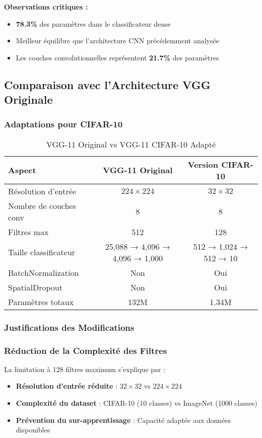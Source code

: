 \documentclass[12pt,a4paper]{article}
\begin{document}
\textbf{Observations critiques :}
\begin{itemize}
    \item \textbf{78.3\%} des paramètres dans le classificateur dense
    \item Meilleur équilibre que l'architecture CNN précédemment analysée
    \item Les couches convolutionnelles représentent \textbf{21.7\%} des paramètres
\end{itemize}

\subsection{Comparaison avec l'Architecture VGG Originale}

\subsubsection{Adaptations pour CIFAR-10}

\begin{table}[H]
\centering
\caption{VGG-11 Original vs VGG-11 CIFAR-10 Adapté}
\begin{tabular}{lcc}
\toprule
\textbf{Aspect} & \textbf{VGG-11 Original} & \textbf{Version CIFAR-10} \\
\midrule
Résolution d'entrée & $224 \times 224$ & $32 \times 32$ \\
Nombre de couches conv & 8 & 8 \\
Filtres max & 512 & 128 \\
Taille classificateur & 25,088 → 4,096 → 4,096 → 1,000 & 512 → 1,024 → 512 → 10 \\
BatchNormalization & Non & Oui \\
SpatialDropout & Non & Oui \\
Paramètres totaux & 132M & 1.34M \\
\bottomrule
\end{tabular}
\end{table}

\subsubsection{Justifications des Modifications}

\subsubsection{Réduction de la Complexité des Filtres}

La limitation à 128 filtres maximum s'explique par :
\begin{itemize}
    \item \textbf{Résolution d'entrée réduite} : $32 \times 32$ vs $224 \times 224$
    \item \textbf{Complexité du dataset} : CIFAR-10 (10 classes) vs ImageNet (1000 classes)
    \item \textbf{Prévention du sur-apprentissage} : Capacité adaptée aux données disponibles
\end{itemize}
\end{document}
